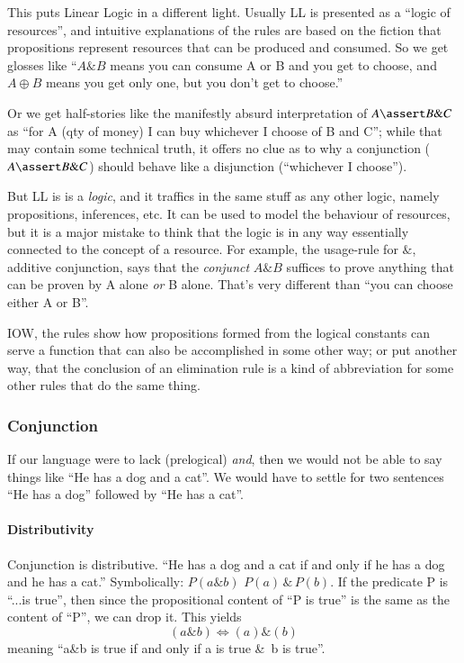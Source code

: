 This puts Linear Logic in a different light. Usually LL is presented
as a ``logic of resources'', and intuitive explanations of the rules
are based on the fiction that propositions represent resources that
can be produced and consumed. So we get glosses like ``\(A\&B\) means
you can consume A or B and you get to choose, and \(A\oplus B\) means
you get only one, but you don't get to choose.''

Or we get half-stories like the manifestly absurd interpretation of
\(A\linfer B\&C\) as ``for A (qty of money) I can buy whichever I
choose of B and C''; while that may contain some technical truth, it
offers no clue as to why a conjunction (\(A\linfer B\&C\)) should
behave like a disjunction (``whichever I choose'').

But LL is is a \textit{logic}, and it traffics in the same stuff as
any other logic, namely propositions, inferences, etc. It can be used
to model the behaviour of resources, but it is a major mistake to
think that the logic is in any way essentially connected to the
concept of a resource. For example, the usage-rule for \(\&\),
additive conjunction, says that the \textit{conjunct} \(A\&B\)
suffices to prove anything that can be proven by A alone \textit{or} B
alone.  That's very different than ``you can choose either A or B''.

IOW, the rules show how propositions formed from the logical constants
can serve a function that can also be accomplished in some other way;
or put another way, that the conclusion of an elimination rule is a
kind of abbreviation for some other rules that do the same thing.

\subsubsection{Conjunction}

If our language were to lack (prelogical) \textit{and}, then we would
not be able to say things like ``He has a dog and a cat''. We would
have to settle for two sentences ``He has a dog'' followed by ``He
has a cat''.

\paragraph{Distributivity
\newline}

Conjunction is distributive. ``He has a dog and a cat if and only if
he has a dog and he has a cat.'' Symbolically: \(P(a\&b)\)\iff
\(P(a)\,\&\,P(b)\). If the predicate P is ``...is true'', then since the
propositional content of ``P is true'' is the same as the content of
``P'', we can drop it. This yields \[(a\&b)\iff (a)\&(b)\] meaning
``a\&b is true if and only if a is true \&\, b is true''.

